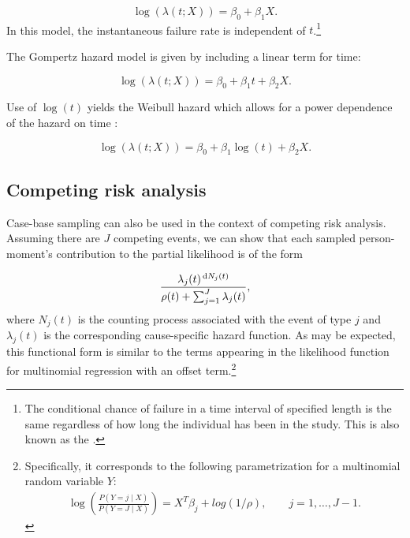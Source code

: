 \begin{equation}
\log(\lambda(t; X)) = \beta_0 + \beta_1 X. \label{eq:exp}
\end{equation} In this model, the instantaneous failure rate is
independent of
\(t\).\footnote{The conditional chance of failure in a time interval of specified length is the same regardless of how long the individual has been in the study. This is also known as the  \citep{kalbfleisch2011statistical}.}

The Gompertz hazard model is given by including a linear term for time:

\begin{equation}
\log(\lambda(t; X)) = \beta_0 + \beta_1 t + \beta_2 X. \label{eq:gomp}
\end{equation}

Use of \(\log(t)\) yields the Weibull hazard which allows for a power
dependence of the hazard on time \citep{kalbfleisch2011statistical}:

\begin{equation}
\log(\lambda(t; X)) = \beta_0 + \beta_1 \log(t) + \beta_2 X. \label{eq:weibull}
\end{equation}

\hypertarget{competing-risk-analysis}{%
\subsection{Competing risk analysis}\label{competing-risk-analysis}}

Case-base sampling can also be used in the context of competing risk
analysis. Assuming there are \(J\) competing events, we can show that
each sampled person-moment's contribution to the partial likelihood is
of the form

\[\frac{\lambda_j(t)^{\,\textrm dN_j(t)}}{\rho(t) + \sum_{j=1}^J\lambda_j(t)},\]
where \(N_j(t)\) is the counting process associated with the event of
type \(j\) and \(\lambda_j(t)\) is the corresponding cause-specific
hazard function. As may be expected, this functional form is similar to
the terms appearing in the likelihood function for multinomial
regression with an offset
term.\footnote{Specifically, it corresponds to the following parametrization  for a multinomial random variable $Y$: \begin{align*} \log\left(\frac{P(Y=j \mid X)}{P(Y = J \mid X)}\right) = X^T\beta_j + log(1/\rho), \qquad j = 1,\ldots, J-1.\end{align*}}

